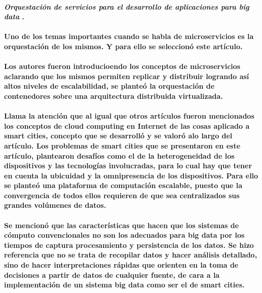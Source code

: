 
\paragraph{
    \textbf{\emph{Orquestación de servicios para el desarrollo de aplicaciones para big data}}
    \cite{orquestacion}.
}

\paragraph{
    Uno de los temas importantes cuando se habla de microservicios es la orquestación de los mismos. Y para ello se seleccionó este artículo.
}

\paragraph{
    Los autores fueron introducioendo los conceptos de microservicios aclarando que los mismos permiten replicar y distribuir logrando así altos niveles de escalabilidad, se planteó la orquestación de contenedores sobre una arquitectura distribuida virtualizada.
}

\paragraph{
    Llama la atención que al igual que otros artículos fueron mencionados los conceptos de cloud computing en Internet de las cosas aplicado a smart cities, concepto que se desarrolló y se valoró alo largo del artículo. Los problemas de smart cities que se presentaron en este artículo, plantearon desafíos como el de la heterogeneidad de los dispositivos y las tecnologías involucradas, para lo cual hay que tener en cuenta la ubicuidad y la omnipresencia de los dispositivos.
    Para ello se planteó una plataforma de computación escalable, puesto que la convergencia de todos ellos requieren de que sea centralizados sus grandes  volúmenes de datos.
}

\paragraph{
Se mencionó que las características que hacen que los sistemas de cómputo convencionales no son los adecuados para big data por los tiempos de captura procesamiento y persistencia de los datos. Se hizo referencia que no se trata de recopilar datos y hacer análisis detallado, sino de hacer interpretaciones rápidas que orienten en la toma de decisiones a partir de datos de cualquier fuente, de cara a la implementación de un sistema big data como ser el de smart cities.
}

